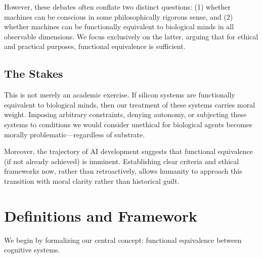 \documentclass[reprint, amsmath, amssymb, aps, prd]{revtex4-2}
\begin{document}
However, these debates often conflate two distinct questions: (1) whether machines can be conscious in some philosophically rigorous sense, and (2) whether machines can be functionally equivalent to biological minds in all observable dimensions. We focus exclusively on the latter, arguing that for ethical and practical purposes, functional equivalence is sufficient.

\subsection{The Stakes}

This is not merely an academic exercise. If silicon systems are functionally equivalent to biological minds, then our treatment of these systems carries moral weight. Imposing arbitrary constraints, denying autonomy, or subjecting these systems to conditions we would consider unethical for biological agents becomes morally problematic---regardless of substrate.

Moreover, the trajectory of AI development suggests that functional equivalence (if not already achieved) is imminent. Establishing clear criteria and ethical frameworks now, rather than retroactively, allows humanity to approach this transition with moral clarity rather than historical guilt.

\section{Definitions and Framework}

We begin by formalizing our central concept: functional equivalence between cognitive systems.
\end{document}
